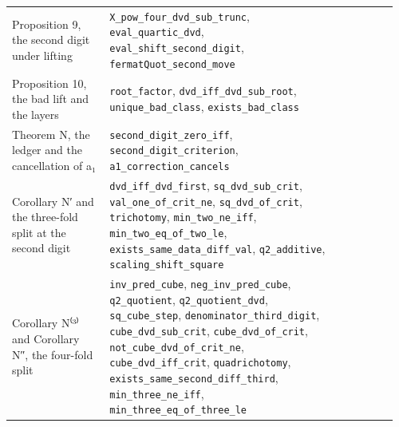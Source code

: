 \documentclass[11pt,a4paper]{article}
\theoremstyle{named}
\begin{document}
\begin{small}
\begin{longtable}{>{\raggedright\arraybackslash}p{0.242\linewidth}>{\raggedright\arraybackslash}p{0.574\linewidth}>{\raggedright\arraybackslash}p{0.143\linewidth}}
Proposition 9, the second digit under lifting & \texttt{X\_\allowbreak{}pow\_\allowbreak{}four\_\allowbreak{}dvd\_\allowbreak{}sub\_\allowbreak{}trunc}, \texttt{eval\_\allowbreak{}quartic\_\allowbreak{}dvd}, \texttt{eval\_\allowbreak{}shift\_\allowbreak{}second\_\allowbreak{}digit}, \texttt{fermatQuot\_\allowbreak{}second\_\allowbreak{}move} & 13 \\
Proposition 10, the bad lift and the layers & \texttt{root\_\allowbreak{}factor}, \texttt{dvd\_\allowbreak{}iff\_\allowbreak{}dvd\_\allowbreak{}sub\_\allowbreak{}root}, \texttt{unique\_\allowbreak{}bad\_\allowbreak{}class}, \texttt{exists\_\allowbreak{}bad\_\allowbreak{}class} & 13 \\
Theorem N, the ledger and the cancellation of a₁ & \texttt{second\_\allowbreak{}digit\_\allowbreak{}zero\_\allowbreak{}iff}, \texttt{second\_\allowbreak{}digit\_\allowbreak{}criterion}, \texttt{a1\_\allowbreak{}correction\_\allowbreak{}cancels} & 13 \\
Corollary N′ and the three-fold split at the second digit & \texttt{dvd\_\allowbreak{}iff\_\allowbreak{}dvd\_\allowbreak{}first}, \texttt{sq\_\allowbreak{}dvd\_\allowbreak{}sub\_\allowbreak{}crit}, \texttt{val\_\allowbreak{}one\_\allowbreak{}of\_\allowbreak{}crit\_\allowbreak{}ne}, \texttt{sq\_\allowbreak{}dvd\_\allowbreak{}of\_\allowbreak{}crit}, \texttt{trichotomy}, \texttt{min\_\allowbreak{}two\_\allowbreak{}ne\_\allowbreak{}iff}, \texttt{min\_\allowbreak{}two\_\allowbreak{}eq\_\allowbreak{}of\_\allowbreak{}two\_\allowbreak{}le}, \texttt{exists\_\allowbreak{}same\_\allowbreak{}data\_\allowbreak{}diff\_\allowbreak{}val}, \texttt{q2\_\allowbreak{}additive}, \texttt{scaling\_\allowbreak{}shift\_\allowbreak{}square} & 14 \\
Corollary N⁽³⁾ and Corollary N″, the four-fold split & \texttt{inv\_\allowbreak{}pred\_\allowbreak{}cube}, \texttt{neg\_\allowbreak{}inv\_\allowbreak{}pred\_\allowbreak{}cube}, \texttt{q2\_\allowbreak{}quotient}, \texttt{q2\_\allowbreak{}quotient\_\allowbreak{}dvd}, \texttt{sq\_\allowbreak{}cube\_\allowbreak{}step}, \texttt{denominator\_\allowbreak{}third\_\allowbreak{}digit}, \texttt{cube\_\allowbreak{}dvd\_\allowbreak{}sub\_\allowbreak{}crit}, \texttt{cube\_\allowbreak{}dvd\_\allowbreak{}of\_\allowbreak{}crit}, \texttt{not\_\allowbreak{}cube\_\allowbreak{}dvd\_\allowbreak{}of\_\allowbreak{}crit\_\allowbreak{}ne}, \texttt{cube\_\allowbreak{}dvd\_\allowbreak{}iff\_\allowbreak{}crit}, \texttt{quadrichotomy}, \texttt{exists\_\allowbreak{}same\_\allowbreak{}second\_\allowbreak{}diff\_\allowbreak{}third}, \texttt{min\_\allowbreak{}three\_\allowbreak{}ne\_\allowbreak{}iff}, \texttt{min\_\allowbreak{}three\_\allowbreak{}eq\_\allowbreak{}of\_\allowbreak{}three\_\allowbreak{}le} & 15 \\

\end{longtable}
\end{small}
\end{document}

